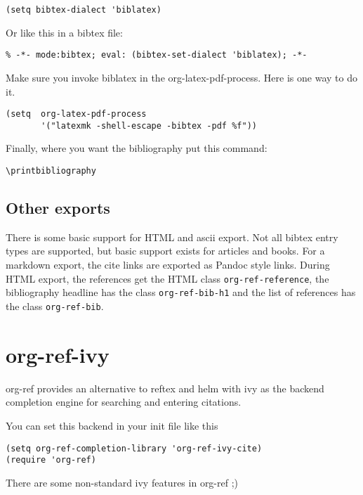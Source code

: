\documentclass[11pt]{article}
\begin{document}
\begin{verbatim}
(setq bibtex-dialect 'biblatex)
\end{verbatim}

Or like this in a bibtex file:
\begin{verbatim}
% -*- mode:bibtex; eval: (bibtex-set-dialect 'biblatex); -*-
\end{verbatim}

Make sure you invoke biblatex in the org-latex-pdf-process. Here is one way to do it.

\begin{verbatim}
(setq  org-latex-pdf-process
       '("latexmk -shell-escape -bibtex -pdf %f"))
\end{verbatim}

Finally, where you want the bibliography put this command:

\begin{verbatim}
\printbibliography
\end{verbatim}


\subsection{Other exports}
\label{sec:orgf2cad36}
 

There is some basic support for HTML and ascii export. Not all bibtex entry types are supported, but basic support exists for articles and books. For a markdown export, the cite links are exported as Pandoc style links. During HTML export, the references get the HTML class \texttt{org-ref-reference}, the bibliography headline has the class \texttt{org-ref-bib-h1} and the list of references has the class \texttt{org-ref-bib}.

\section{org-ref-ivy}
\label{sec:org93d6b98}

org-ref provides an alternative to reftex and helm with ivy as the backend completion engine for searching and entering citations.

You can set this backend in your init file like this
\begin{verbatim}
(setq org-ref-completion-library 'org-ref-ivy-cite)
(require 'org-ref)
\end{verbatim}

There are some non-standard ivy features in org-ref ;)
\end{document}
